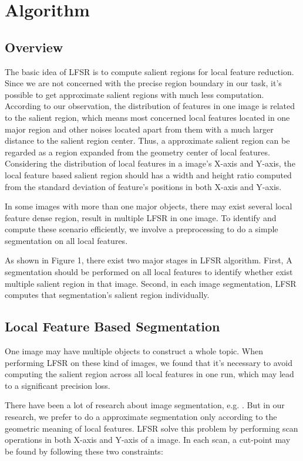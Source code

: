\section{Algorithm}

\subsection{Overview}

The basic idea of LFSR is to compute salient regions for local feature reduction. Since we are not concerned with the precise region boundary in our task, it's possible to get approximate salient regions with much less computation. According to our observation, the distribution of features in one image is related to the salient region, which means most concerned local features located in one major region and other noises located apart from them with a much larger distance to the salient region center. Thus, a approximate salient region can be regarded as a region expanded from the geometry center of local features. Considering the distribution of local features in a image's X-axis and Y-axis, the local feature based salient region should has a width and height ratio computed from the standard deviation of feature's positions in both X-axis and Y-axis.

In some images with more than one major objects, there may exist several local feature dense region, result in multiple LFSR in one image. To identify and compute these scenario efficiently, we involve a preprocessing to do a simple segmentation on all local features. 

As shown in Figure 1, there exist two major stages in LFSR algorithm. First, A segmentation should be performed on all local features to identify whether exist multiple salient region in that image. Second, in each image segmentation, LFSR computes that segmentation's salient region individually.

\subsection{Local Feature Based Segmentation}

One image may have multiple objects to construct a whole topic. When performing LFSR on these kind of images, we found that it's necessary to avoid computing the salient region across all local features in one run, which may lead to a significant precision loss.

There have been a lot of research about image segmentation, e.g. . But in our research, we prefer to do a approximate segmentation only according to the geometric meaning of local features. LFSR solve this problem by performing scan operations in both X-axis and Y-axis of a image. In each scan, a cut-point may be found by following these two constraints:

